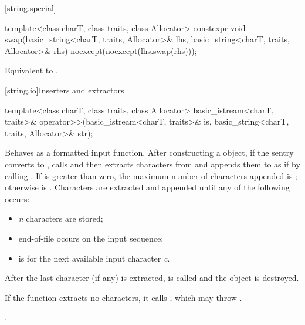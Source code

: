 [string.special]{}

%
\begin{itemdecl}
template<class charT, class traits, class Allocator>
  constexpr void
    swap(basic_string<charT, traits, Allocator>& lhs,
         basic_string<charT, traits, Allocator>& rhs)
      noexcept(noexcept(lhs.swap(rhs)));
\end{itemdecl}

\begin{itemdescr}
\pnum
\effects
Equivalent to .
\end{itemdescr}

[string.io]{Inserters and extractors}

%
\begin{itemdecl}
template<class charT, class traits, class Allocator>
  basic_istream<charT, traits>&
    operator>>(basic_istream<charT, traits>& is, basic_string<charT, traits, Allocator>& str);
\end{itemdecl}

\begin{itemdescr}
\pnum
\effects
Behaves as a formatted input function.
After constructing a
object, if the sentry converts to , calls
and then extracts characters from  and appends them
to  as if by calling
.
If
is greater than zero, the maximum
number  of characters appended is
;
otherwise  is
.
Characters are extracted and appended until any of the following
occurs:
\begin{itemize}
\item
\textit{n}
characters are stored;
\item
end-of-file occurs on the input sequence;
\item
{}
is  for the next available input character
\textit{c}.
\end{itemize}

\pnum
After the last character (if any) is extracted,
is called and the
object is destroyed.

\pnum
If the function extracts no characters, it calls
,
which may throw
.

\pnum
\returns
{}.
\end{itemdescr}

